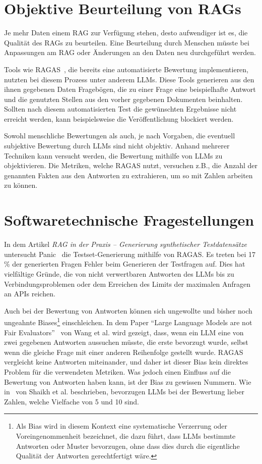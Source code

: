 \section{Objektive Beurteilung von RAGs}
Je mehr Daten einem RAG zur Verfügung stehen, desto aufwendiger ist es, die Qualität des RAGs zu beurteilen.
Eine Beurteilung durch Menschen müsste bei Anpassungen am RAG oder Änderungen an den Daten neu durchgeführt werden.

Tools wie RAGAS~\cite{es-etal-2024-ragas}, die bereits eine automatisierte Bewertung implementieren, nutzten bei diesem Prozess unter anderem LLMs.
Diese Tools generieren aus den ihnen gegebenen Daten Fragebögen, die zu einer Frage eine beispielhafte Antwort und die genutzten Stellen aus den vorher gegebenen Dokumenten beinhalten.
Sollten nach diesem automatisierten Test die gewünschten Ergebnisse nicht erreicht werden, kann beispielsweise die Veröffentlichung blockiert werden.

Sowohl menschliche Bewertungen als auch, je nach Vorgaben, die eventuell subjektive Bewertung durch LLMs sind nicht objektiv.
Anhand mehrerer Techniken kann versucht werden, die Bewertung mithilfe von LLMs zu objektivieren. Die Metriken, welche RAGAS nutzt, versuchen z.B., die Anzahl der genannten Fakten aus den Antworten zu extrahieren, um so mit Zahlen arbeiten zu können.

\section{Softwaretechnische Fragestellungen}

In dem Artikel \textit{RAG in der Praxis – Generierung synthetischer Testdatensätze} untersucht Panic~\cite{pixion2024rag} die Testset-Generierung mithilfe von RAGAS. Es treten bei 17 \% der generierten Fragen Fehler beim Generieren der Testfragen auf.
Dies hat vielfältige Gründe, die von nicht verwertbaren Antworten des LLMs bis zu Verbindungsproblemen oder dem Erreichen des Limits der maximalen Anfragen an APIs reichen.

Auch bei der Bewertung von Antworten können sich ungewollte und bisher noch ungeahnte Biases\footnote{Als Bias wird in diesem Kontext eine systematische Verzerrung oder Voreingenommenheit bezeichnet, die dazu führt, dass LLMs bestimmte Antworten oder Muster bevorzugen, ohne dass dies durch die eigentliche Qualität der Antworten gerechtfertigt wäre.} einschleichen. In dem Paper \enquote{Large Language Models are not Fair Evaluators}~\cite{wang-etal-2024-large-language-models-fair} von Wang et al. wird gezeigt, dass, wenn ein LLM eine von zwei gegebenen Antworten aussuchen müsste, die erste bevorzugt wurde, selbst wenn die gleiche Frage mit einer anderen Reihenfolge gestellt wurde.
RAGAS vergleicht keine Antworten miteinander, und daher ist dieser Bias kein direktes Problem für die verwendeten Metriken. Was jedoch einen Einfluss auf die Bewertung von Antworten haben kann, ist der Bias zu gewissen Nummern.
Wie in~\cite{2024arXiv241203605S} von Shaikh et al. beschrieben, bevorzugen LLMs bei der Bewertung lieber Zahlen, welche Vielfache von 5 und 10 sind.

